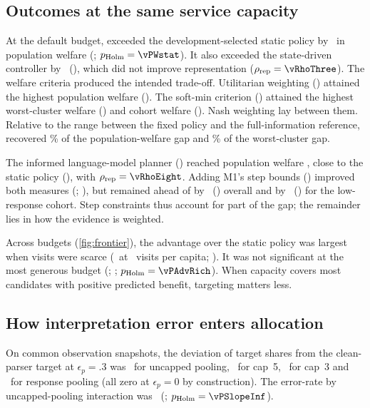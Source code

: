 \subsection{Outcomes at the same service capacity}
\label{sec:budgetresults}
At the default budget,  exceeded the development-selected static policy by \vDWstat\ in population welfare (\vDWstatCI; $p_{\mathrm{Holm}}=\vPWstat$). It also exceeded the state-driven controller  by \vDWthree\ (\vDWthreeCI), which did not improve representation ($\rho_{\mathrm{rep}}=\vRhoThree$). The welfare criteria produced the intended trade-off. Utilitarian weighting () attained the highest population welfare (\vWsevenU). The soft-min criterion () attained the highest worst-cluster welfare (\vWmSevenR) and cohort welfare (\vWsSevenR). Nash weighting lay between them. Relative to the range between the fixed policy and the full-information reference,  recovered \vGapW\% of the population-welfare gap and \vGapWm\% of the worst-cluster gap.

The informed language-model planner () reached population welfare \vWeight, close to the static policy (\vWstat), with $\rho_{\mathrm{rep}}=\vRhoEight$. Adding M1's step bounds () improved both measures (\vWnine; \vRhoNine), but  remained ahead of  by \vDWeight\ (\vDWeightCI) overall and by \vDWseight\ (\vDWseightCI) for the low-response cohort. Step constraints thus account for part of the gap; the remainder lies in how the evidence is weighted.

Across budgets (\cref{fig:frontier}), the advantage over the static policy was largest when visits were scarce (\vAdvMax\ at \vAdvMaxBudget\ visits per capita; \vAdvMaxCI). It was not significant at the most generous budget (\vAdvRich; \vAdvRichCI; $p_{\mathrm{Holm}}=\vPAdvRich$). When capacity covers most candidates with positive predicted benefit, targeting matters less.

\subsection{How interpretation error enters allocation}
\label{sec:errorresults}
On common observation snapshots, the deviation of target shares from the clean-parser target at $\epsilon_p=.3$ was \vDevInfHigh\ for uncapped pooling, \vDevCapFiveHigh\ for cap~5, \vDevCapThreeHigh\ for cap~3 and \vDevNaiveHigh\ for response pooling (all zero at $\epsilon_p=0$ by construction). The error-rate by uncapped-pooling interaction was \vSlopeInf\ (\vSlopeInfCI; $p_{\mathrm{Holm}}=\vPSlopeInf$).

